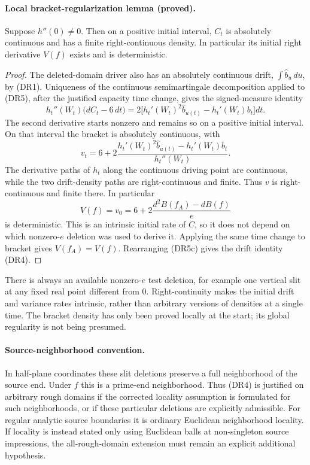 \documentclass[11pt]{article}
\theoremstyle{definition}\newtheorem{definition}[theorem]{Definition}
\theoremstyle{remark}\newtheorem{remark}[theorem]{Remark}
\begin{document}
\paragraph{Local bracket-regularization lemma (proved).}
Suppose $h''(0)\ne0$.  Then on a positive initial interval, $C_t$ is absolutely
continuous and has a finite right-continuous density.  In particular its
initial right derivative $V(f)$ exists and is deterministic.

\begin{proof}
The deleted-domain driver also has an absolutely continuous drift,
$\int\widehat b_u\,du$, by (DR1).  Uniqueness of the continuous
semimartingale decomposition applied to (DR5), after the justified capacity
time change, gives the signed-measure identity
\[
 h_t''(W_t)\bigl(dC_t-6\,dt\bigr)
   =2\bigl[h_t'(W_t)^2\widehat b_{u(t)}
                      -h_t'(W_t)b_t\bigr]dt.
 \tag{DR5a}
\]
The second derivative starts nonzero and remains so on a positive initial
interval.  On that interval the bracket is absolutely continuous, with
\[
 v_t=6+2\frac{h_t'(W_t)^2\widehat b_{u(t)}
                         -h_t'(W_t)b_t}{h_t''(W_t)}.
 \tag{DR5b}
\]
The derivative paths of $h_t$ along the continuous driving point are
continuous, while the two drift-density paths are right-continuous and
finite.  Thus $v$ is right-continuous and finite there.  In particular
\[
 V(f)=v_0
   =6+2\frac{d^2 B(f_A)-d B(f)}e
 \tag{DR5c}
\]
is deterministic.  This is an intrinsic initial rate of $C$, so it does
not depend on which nonzero-$e$ deletion was used to derive it.
Applying the same time change to bracket gives
$V(f_A)=V(f)$.  Rearranging (DR5c) gives the drift identity (DR4).
\end{proof}

There is always an available nonzero-$e$ test deletion, for example one
vertical slit at any fixed real point different from $0$.  Right-continuity
makes the initial drift and variance rates intrinsic, rather than arbitrary
versions of densities at a single time.  The bracket density has only been
proved locally at the start; its global regularity is not being presumed.

\paragraph{Source-neighborhood convention.}
In half-plane coordinates these slit deletions preserve a full neighborhood
of the source end.  Under $f$ this is a prime-end neighborhood.  Thus (DR4)
is justified on arbitrary rough domains if the corrected locality assumption
is formulated for such neighborhoods, or if these particular deletions are
explicitly admissible.  For regular analytic source boundaries it is ordinary
Euclidean neighborhood locality.  If locality is instead stated only using
Euclidean balls at non-singleton source impressions, the all-rough-domain
extension must remain an explicit additional hypothesis.
\end{document}
